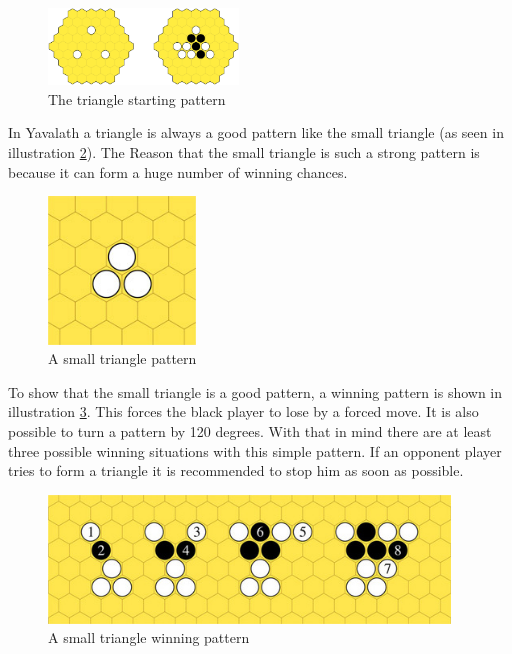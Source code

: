 \documentclass[english]{report} \usepackage[english]{babel}
\begin{document}
\begin{figure}[H]
\centering
\includegraphics[width=0.45\textwidth]{Abbildungen/yav_triangle.png}
\caption[The triangle starting pattern, Source:\cite{yvalath}]{The triangle starting pattern}
\label{fig:yav_triangle}
\end{figure}

In Yavalath a triangle is always a good pattern like the small triangle (as seen
in illustration \ref{fig:yav_smallTriangle}). The Reason that the small triangle
is such a strong pattern is because it can form a huge number of winning
chances.


\begin{figure}[H]
\centering
\includegraphics[width=0.35\textwidth]{Abbildungen/yav_smallTriangle.png}
\caption[A small triangle pattern, Source:\cite{yvalathBGG}]{A small triangle pattern}
\label{fig:yav_smallTriangle}
\end{figure}

To show that the small triangle is a good pattern, a winning pattern is shown in
illustration \ref{fig:yav_smallTriangleWin1}. This forces the black player to
lose by a forced move. It is also possible to turn a pattern by 120 degrees. With
that in mind there are at least three possible winning situations with this
simple pattern. If an opponent player tries to form a triangle it is recommended
to stop him as soon as possible.\cite{yvalathBGG}

\begin{figure}[H]
\centering
\includegraphics[width=0.95\textwidth]{Abbildungen/yav_smallTriangleWin1.png}
\caption[A small triangle winning pattern, Source:\cite{yvalathBGG}]{A small triangle winning pattern}
\label{fig:yav_smallTriangleWin1}
\end{figure}
\end{document}
